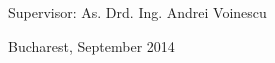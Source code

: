 \vfill\vfill\vfill
\begin{center}
	\Large
	Supervisor: As. Drd. Ing. Andrei Voinescu\\
\end{center}

\vfill
\begin{center}
	\large
	Bucharest, September 2014
\end{center}

\cleardoublepage


\pagestyle{headings}
\tableofcontents


